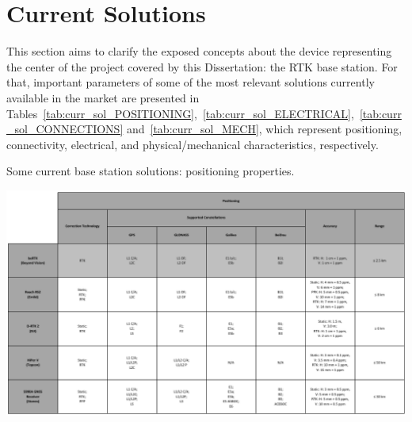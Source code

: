 

\section{Current Solutions}\label{sec:II_curr_solutions}

This section aims to clarify the exposed concepts about the device representing the center of the project covered by this Dissertation: the RTK base station. For that, important parameters of some of the most relevant solutions currently available in the market are presented in Tables~\ref{tab:curr_sol_POSITIONING},~\ref{tab:curr_sol_ELECTRICAL},~\ref{tab:curr_sol_CONNECTIONS} and~\ref{tab:curr_sol_MECH}, which represent positioning, connectivity, electrical, and physical/mechanical characteristics, respectively.

\begingroup
\begin{table}[h]
    \centering
	\captionsetup{justification=centering}
    \caption{Some current base station solutions: positioning properties.}
    \includegraphics[width=1.0\textwidth]{Chapters/Figures/curr_solutions/POSITIONING_v2.pdf}
	\label{tab:curr_sol_POSITIONING}
\end{table}
\endgroup

